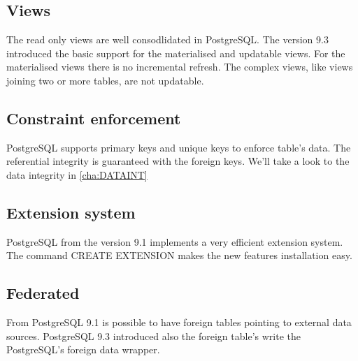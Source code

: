 \subsection{Views}
The read only views are well consodlidated in PostgreSQL.
The version 9.3 introduced the basic support for the materialised and updatable views.
For the materialised views there is no incremental refresh. The complex views, like views 
joining two or more tables, are not updatable. 

\subsection{Constraint enforcement}
PostgreSQL supports primary keys and unique keys to enforce table's data. The referential integrity 
is guaranteed with the foreign keys. We'll take a look to the data integrity in \ref{cha:DATAINT}

\subsection{Extension system}
PostgreSQL from the version 9.1 implements a very efficient extension system. The command CREATE 
EXTENSION makes the new features installation easy.

\subsection{Federated}
From PostgreSQL 9.1 is possible to have foreign tables pointing to external data sources. 
PostgreSQL 9.3 introduced also the foreign table's write the PostgreSQL's foreign data 
wrapper.